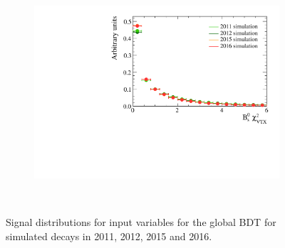 \begin{figure}
 \begin{subfigure}[b]{0.48\textwidth}
        \includegraphics[width=\textwidth]{./Figs/Appendix1/signal_end_vertex.pdf}
    \end{subfigure}
    ~ %
 



    \caption{Signal distributions for input variables for the global BDT for \bsmumu simulated decays in 2011, 2012, 2015 and 2016.}
    \label{fig:signalvars}
\end{figure}



